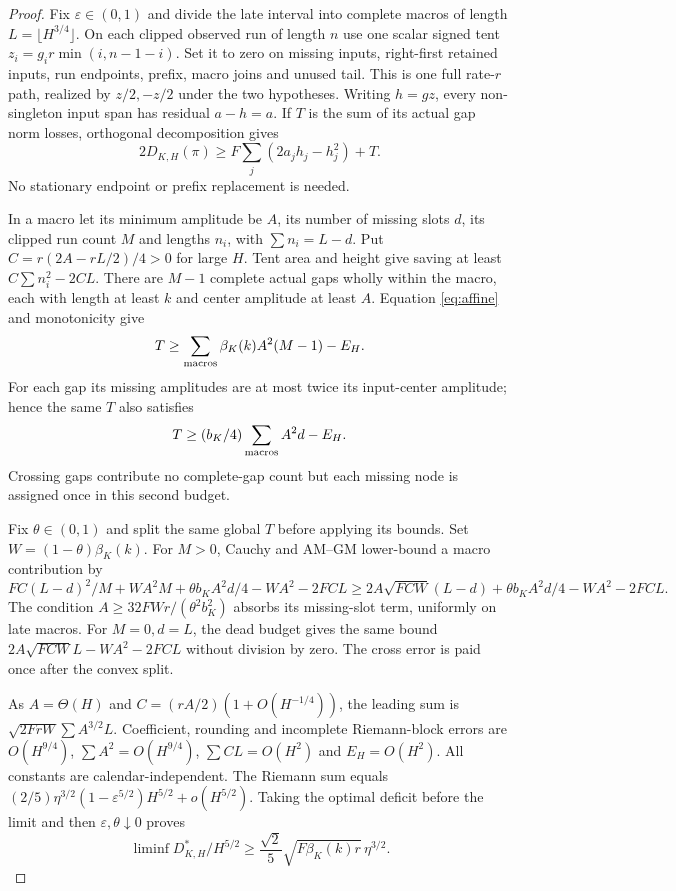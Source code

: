 \documentclass[11pt]{article}
\begin{document}
\begin{proof}
Fix $\varepsilon\in(0,1)$ and divide the late interval into complete macros
of length $L=\lfloor H^{3/4}\rfloor$.
On each clipped observed run of length $n$ use one scalar signed tent
$z_i=g_i r\min(i,n-1-i)$.
Set it to zero on missing inputs, right-first retained inputs, run endpoints,
prefix, macro joins and unused tail. This is one full rate-$r$ path, realized
by $z/2,-z/2$ under the two hypotheses.
Writing $h=gz$, every non-singleton input span has residual $a-h=a$.
If $T$ is the sum of its actual gap norm losses, orthogonal decomposition gives
\begin{equation}\label{eq:converse}
2D_{K,H}(\pi)\ge F\sum_j(2a_jh_j-h_j^2)+T .
\end{equation}
No stationary endpoint or prefix replacement is needed.

In a macro let its minimum amplitude be $A$, its number of missing slots $d$,
its clipped run count $M$ and lengths $n_i$, with $\sum n_i=L-d$.
Put $C=r(2A-rL/2)/4>0$ for large $H$.
Tent area and height give saving at least $C\sum n_i^2-2CL$.
There are $M-1$ complete actual gaps wholly within the macro, each with length
at least $k$ and center amplitude at least $A$.
Equation \eqref{eq:affine} and monotonicity give
\[
T\ge\sum_{\rm macros}\beta_K(k)A^2(M-1)-E_H.
\]
For each gap its missing amplitudes are at most twice its input-center
amplitude; hence the same $T$ also satisfies
\[
T\ge(b_K/4)\sum_{\rm macros}A^2d-E_H .
\]
Crossing gaps contribute no complete-gap count but each missing node is
assigned once in this second budget.

Fix $\theta\in(0,1)$ and split the same global $T$ before applying its bounds.
Set $W=(1-\theta)\beta_K(k)$.
For $M>0$, Cauchy and AM--GM lower-bound a macro contribution by
\[
FC(L-d)^2/M+WA^2M+\theta b_KA^2d/4-WA^2-2FCL
\ge2A\sqrt{FCW}(L-d)+\theta b_KA^2d/4-WA^2-2FCL.
\]
The condition $A\ge32FWr/(\theta^2b_K^2)$ absorbs its missing-slot term,
uniformly on late macros. For $M=0,d=L$, the dead budget gives the same
bound $2A\sqrt{FCW}L-WA^2-2FCL$ without division by zero.
The cross error is paid once after the convex split.

As $A=\Theta(H)$ and $C=(rA/2)(1+O(H^{-1/4}))$, the leading sum is
$\sqrt{2FrW}\sum A^{3/2}L$.
Coefficient, rounding and incomplete Riemann-block errors are $O(H^{9/4})$,
$\sum A^2=O(H^{9/4})$, $\sum CL=O(H^2)$ and $E_H=O(H^2)$.
All constants are calendar-independent.
The Riemann sum equals
$(2/5)\eta^{3/2}(1-\varepsilon^{5/2})H^{5/2}+o(H^{5/2})$.
Taking the optimal deficit before the limit and then
$\varepsilon,\theta\downarrow0$ proves
\begin{equation}\label{eq:lower}
\liminf D_{K,H}^*/H^{5/2}\ge
\frac{\sqrt2}{5}\sqrt{F\beta_K(k)r}\,\eta^{3/2}.
\end{equation}


\end{proof}
\end{document}
